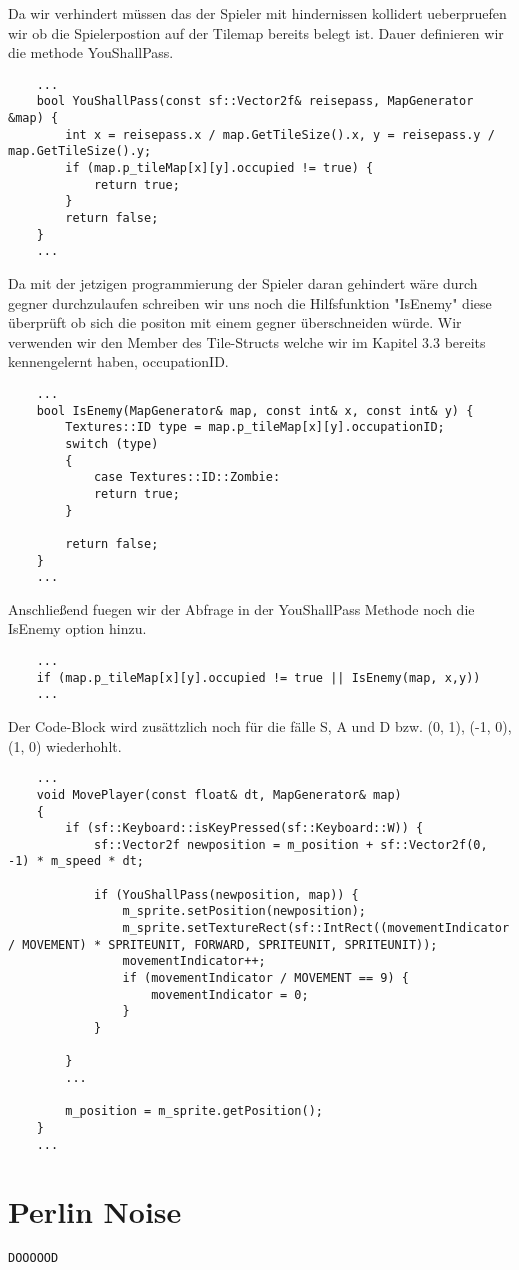 Da wir verhindert müssen das der Spieler mit hindernissen kollidert ueberpruefen wir ob die Spielerpostion auf der Tilemap bereits belegt ist. Dauer definieren wir die
methode YouShallPass.

\begin{lstlisting}
	...
	bool YouShallPass(const sf::Vector2f& reisepass, MapGenerator &map) {
		int x = reisepass.x / map.GetTileSize().x, y = reisepass.y / map.GetTileSize().y; 
		if (map.p_tileMap[x][y].occupied != true) {
			return true; 
		}
		return false; 
	}
	...
\end{lstlisting}

Da mit der jetzigen programmierung der Spieler daran gehindert wäre durch gegner durchzulaufen schreiben wir uns noch die Hilfsfunktion "IsEnemy" diese überprüft ob sich die positon mit einem gegner überschneiden würde. Wir verwenden wir den Member des Tile-Structs welche wir im Kapitel 3.3 bereits kennengelernt haben, occupationID. 

\begin{lstlisting}
	...
	bool IsEnemy(MapGenerator& map, const int& x, const int& y) {
		Textures::ID type = map.p_tileMap[x][y].occupationID; 
		switch (type)
		{
			case Textures::ID::Zombie:
			return true; 
		}
		
		return false; 
	}
	...
\end{lstlisting}

Anschließend fuegen wir der Abfrage in der YouShallPass Methode noch die IsEnemy option hinzu.

\begin{lstlisting}
	...
    if (map.p_tileMap[x][y].occupied != true || IsEnemy(map, x,y)) 
	...
\end{lstlisting}

Der Code-Block wird zusättzlich noch für die fälle S, A und D bzw. (0, 1), (-1, 0), (1, 0) wiederhohlt.  

\begin{lstlisting}
	...
	void MovePlayer(const float& dt, MapGenerator& map)
	{
		if (sf::Keyboard::isKeyPressed(sf::Keyboard::W)) {
			sf::Vector2f newposition = m_position + sf::Vector2f(0, -1) * m_speed * dt; 
			
			if (YouShallPass(newposition, map)) {
				m_sprite.setPosition(newposition);
				m_sprite.setTextureRect(sf::IntRect((movementIndicator / MOVEMENT) * SPRITEUNIT, FORWARD, SPRITEUNIT, SPRITEUNIT));
				movementIndicator++;
				if (movementIndicator / MOVEMENT == 9) {
					movementIndicator = 0;
				}
			}
			
		}
		...
		
		m_position = m_sprite.getPosition();
	}
	...
\end{lstlisting}



\newpage
\section{Perlin Noise}


\begin{lstlisting}
DOOOOOD
\end{lstlisting}








